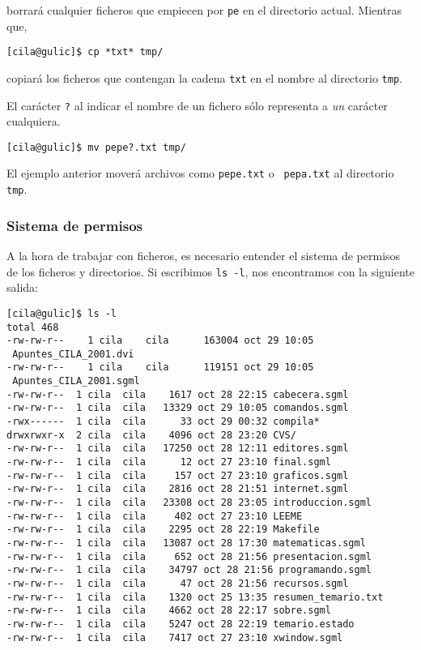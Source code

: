 \noindent borrará cualquier  ficheros que empiecen por {\tt  pe} en el
directorio actual. Mientras que,

\begin{verbatim}
[cila@gulic]$ cp *txt* tmp/
\end{verbatim}

\noindent copiará los ficheros que contengan la cadena {\tt txt} en el
nombre al directorio {\tt tmp}.

El carácter {\tt ?} al indicar el nombre de un fichero sólo representa
a {\em un} carácter cualquiera.

\begin{verbatim}
[cila@gulic]$ mv pepe?.txt tmp/
\end{verbatim}

El  ejemplo  anterior  moverá  archivos como  {\tt  pepe.txt}  o  {\tt
pepa.txt} al directorio {\tt tmp}.

\subsubsection{Sistema de permisos}

A la hora  de trabajar con ficheros, es necesario  entender el sistema
de  permisos de  los ficheros  y  directorios. Si  escribimos {\tt  ls
-l},
nos encontramos con la siguiente salida: 

\begin{verbatim}
[cila@gulic]$ ls -l
total 468
-rw-rw-r--    1 cila    cila      163004 oct 29 10:05
 Apuntes_CILA_2001.dvi
-rw-rw-r--    1 cila    cila      119151 oct 29 10:05
 Apuntes_CILA_2001.sgml
-rw-rw-r--  1 cila  cila    1617 oct 28 22:15 cabecera.sgml
-rw-rw-r--  1 cila  cila   13329 oct 29 10:05 comandos.sgml
-rwx------  1 cila  cila      33 oct 29 00:32 compila*
drwxrwxr-x  2 cila  cila    4096 oct 28 23:20 CVS/
-rw-rw-r--  1 cila  cila   17250 oct 28 12:11 editores.sgml
-rw-rw-r--  1 cila  cila      12 oct 27 23:10 final.sgml
-rw-rw-r--  1 cila  cila     157 oct 27 23:10 graficos.sgml
-rw-rw-r--  1 cila  cila    2816 oct 28 21:51 internet.sgml
-rw-rw-r--  1 cila  cila   23308 oct 28 23:05 introduccion.sgml
-rw-rw-r--  1 cila  cila     402 oct 27 23:10 LEEME
-rw-rw-r--  1 cila  cila    2295 oct 28 22:19 Makefile
-rw-rw-r--  1 cila  cila   13087 oct 28 17:30 matematicas.sgml
-rw-rw-r--  1 cila  cila     652 oct 28 21:56 presentacion.sgml
-rw-rw-r--  1 cila  cila    34797 oct 28 21:56 programando.sgml
-rw-rw-r--  1 cila  cila      47 oct 28 21:56 recursos.sgml
-rw-rw-r--  1 cila  cila    1320 oct 25 13:35 resumen_temario.txt
-rw-rw-r--  1 cila  cila    4662 oct 28 22:17 sobre.sgml
-rw-rw-r--  1 cila  cila    5247 oct 28 22:19 temario.estado
-rw-rw-r--  1 cila  cila    7417 oct 27 23:10 xwindow.sgml
\end{verbatim}

